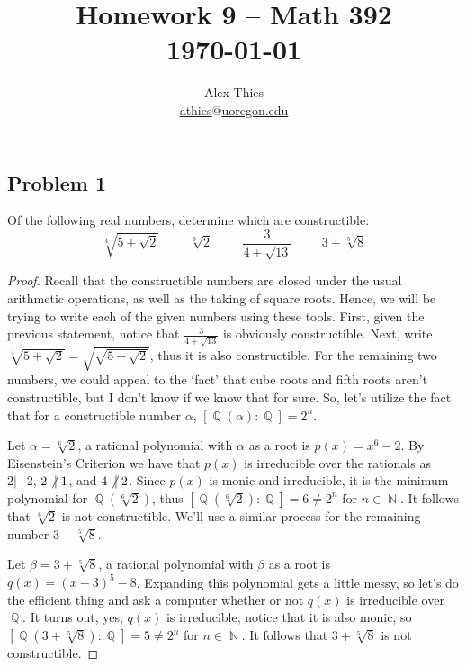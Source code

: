 \documentclass[letterpaper, 12pt]{amsart}
\DeclareMathOperator{\N}{\mathbb{N}}
\DeclareMathOperator{\Q}{\mathbb{Q}}
\theoremstyle{definition}  %
\begin{document}
	\title{Homework 9  -- Math 392 \\ \today}
	\author{Alex Thies \\ \href{mailto:athies@uoregon.edu}{\lowercase{athies$@$uoregon.edu}}}

	\maketitle

	\subsection*{Problem 1}
	\label{sub:problem_1}
	Of the following real numbers, determine which are constructible: \[ \sqrt[4]{5 + \sqrt{2}} \hspace{1cm} \sqrt[6]{2} \hspace{1cm} \frac{3}{4 + \sqrt{13}} \hspace{1cm} 3 + \sqrt[5]{8} \]

	\begin{proof}
	Recall that the constructible numbers are closed under the usual arithmetic operations, as well as the taking of square roots.
	Hence, we will be trying to write each of the given numbers using these tools.
	First, given the previous statement, notice that $\frac{3}{4 + \sqrt{13}}$ is obviously constructible.
	Next, write $\sqrt[4]{5 + \sqrt{2}} = \sqrt{\sqrt{5 + \sqrt{2}}}$, thus it is also constructible.
	For the remaining two numbers, we could appeal to the `fact' that cube roots and fifth roots aren't constructible, but I don't know if we know that for sure.
	So, let's utilize the fact that for a constructible number $\alpha$, $\left[\Q(\alpha) : \Q \right] = 2^{n}$.

	Let $\alpha = \sqrt[6]{2}$, a rational polynomial with $\alpha$ as a root is $p(x) = x^{6} - 2$.
	By Eisenstein's Criterion we have that $p(x)$ is irreducible over the rationals as $2 | -2$, $2 \not| \hspace{1mm} 1$, and $4 \not| \hspace{1mm} 2$.
	Since $p(x)$ is monic and irreducible, it is the minimum polynomial for $\Q(\sqrt[6]{2})$, thus $\left[\Q(\sqrt[6]{2}) : \Q \right] = 6 \neq 2^{n}$ for $n \in \N$.
	It follows that $\sqrt[6]{2}$ is not constructible.
	We'll use a similar process for the remaining number $3 + \sqrt[5]{8}$.

	Let $\beta = 3 + \sqrt[5]{8}$, a rational polynomial with $\beta$ as a root is $q(x) = (x - 3)^{5} - 8$.
	Expanding this polynomial gets a little messy, so let's do the efficient thing and ask a computer whether or not $q(x)$ is irreducible over $\Q$.
	It turns out, yes, $q(x)$ is irreducible, notice that it is also monic, so $\left[\Q(3 + \sqrt[5]{8}) : \Q \right] = 5 \neq 2^{n}$ for $n \in \N$.
	It follows that $3 + \sqrt[5]{8}$ is not constructible.
	\end{proof}
\end{document}
